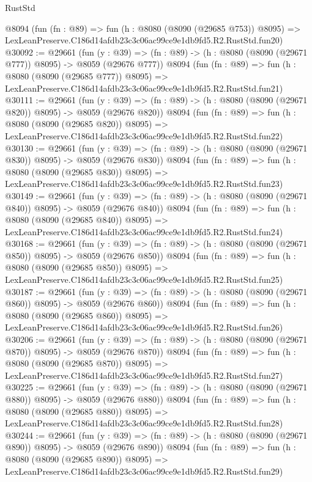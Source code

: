 \begin{lexlean}{RustStd}
\begin{coremodule}
    @8094
    (fun (fn : @89) =>
    fun (h : @8080 (@8090 (@29685 @753)) @8095) =>
    LexLeanPreserve.C186d14afdb23c3c06ac99ce9e1db9fd5.R2.RustStd.fun20)
@30092 := @29661
    (fun (y : @39) => (fn : @89) -> (h : @8080 (@8090 (@29671 @777)) @8095) -> @8059 (@29676 @777))
    @8094
    (fun (fn : @89) =>
    fun (h : @8080 (@8090 (@29685 @777)) @8095) =>
    LexLeanPreserve.C186d14afdb23c3c06ac99ce9e1db9fd5.R2.RustStd.fun21)
@30111 := @29661
    (fun (y : @39) => (fn : @89) -> (h : @8080 (@8090 (@29671 @820)) @8095) -> @8059 (@29676 @820))
    @8094
    (fun (fn : @89) =>
    fun (h : @8080 (@8090 (@29685 @820)) @8095) =>
    LexLeanPreserve.C186d14afdb23c3c06ac99ce9e1db9fd5.R2.RustStd.fun22)
@30130 := @29661
    (fun (y : @39) => (fn : @89) -> (h : @8080 (@8090 (@29671 @830)) @8095) -> @8059 (@29676 @830))
    @8094
    (fun (fn : @89) =>
    fun (h : @8080 (@8090 (@29685 @830)) @8095) =>
    LexLeanPreserve.C186d14afdb23c3c06ac99ce9e1db9fd5.R2.RustStd.fun23)
@30149 := @29661
    (fun (y : @39) => (fn : @89) -> (h : @8080 (@8090 (@29671 @840)) @8095) -> @8059 (@29676 @840))
    @8094
    (fun (fn : @89) =>
    fun (h : @8080 (@8090 (@29685 @840)) @8095) =>
    LexLeanPreserve.C186d14afdb23c3c06ac99ce9e1db9fd5.R2.RustStd.fun24)
@30168 := @29661
    (fun (y : @39) => (fn : @89) -> (h : @8080 (@8090 (@29671 @850)) @8095) -> @8059 (@29676 @850))
    @8094
    (fun (fn : @89) =>
    fun (h : @8080 (@8090 (@29685 @850)) @8095) =>
    LexLeanPreserve.C186d14afdb23c3c06ac99ce9e1db9fd5.R2.RustStd.fun25)
@30187 := @29661
    (fun (y : @39) => (fn : @89) -> (h : @8080 (@8090 (@29671 @860)) @8095) -> @8059 (@29676 @860))
    @8094
    (fun (fn : @89) =>
    fun (h : @8080 (@8090 (@29685 @860)) @8095) =>
    LexLeanPreserve.C186d14afdb23c3c06ac99ce9e1db9fd5.R2.RustStd.fun26)
@30206 := @29661
    (fun (y : @39) => (fn : @89) -> (h : @8080 (@8090 (@29671 @870)) @8095) -> @8059 (@29676 @870))
    @8094
    (fun (fn : @89) =>
    fun (h : @8080 (@8090 (@29685 @870)) @8095) =>
    LexLeanPreserve.C186d14afdb23c3c06ac99ce9e1db9fd5.R2.RustStd.fun27)
@30225 := @29661
    (fun (y : @39) => (fn : @89) -> (h : @8080 (@8090 (@29671 @880)) @8095) -> @8059 (@29676 @880))
    @8094
    (fun (fn : @89) =>
    fun (h : @8080 (@8090 (@29685 @880)) @8095) =>
    LexLeanPreserve.C186d14afdb23c3c06ac99ce9e1db9fd5.R2.RustStd.fun28)
@30244 := @29661
    (fun (y : @39) => (fn : @89) -> (h : @8080 (@8090 (@29671 @890)) @8095) -> @8059 (@29676 @890))
    @8094
    (fun (fn : @89) =>
    fun (h : @8080 (@8090 (@29685 @890)) @8095) =>
    LexLeanPreserve.C186d14afdb23c3c06ac99ce9e1db9fd5.R2.RustStd.fun29)

\end{coremodule}
\end{lexlean}
